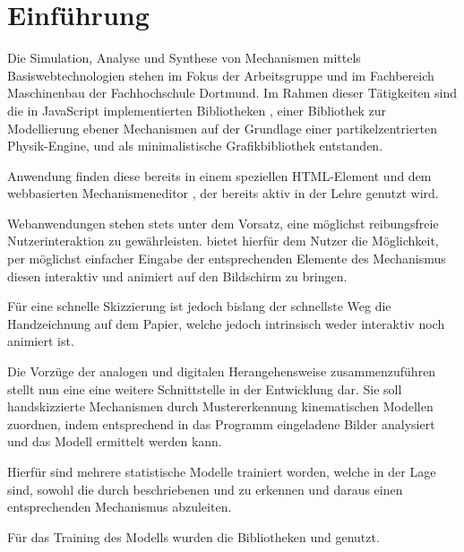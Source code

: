 \section{Einführung}
Die Simulation, Analyse und Synthese von Mechanismen mittels Basiswebtechnologien stehen im Fokus der Arbeitsgruppe  und  im Fachbereich Maschinenbau der Fachhochschule Dortmund.
Im Rahmen dieser Tätigkeiten sind die in JavaScript implementierten Bibliotheken \cite{Goessner2019}\cite{Goessner2019a}\cite{Goessner2018}, einer Bibliothek zur Modellierung ebener Mechanismen auf der Grundlage einer partikelzentrierten Physik-Engine, und \cite{Goessner2019b} als minimalistische Grafikbibliothek entstanden. 

Anwendung finden diese bereits in einem speziellen  HTML-Element und dem webbasierten Mechanismeneditor \cite{Uhlig2019}\cite{Uhlig2019a}, der bereits aktiv in der Lehre genutzt wird.

Webanwendungen stehen stets unter dem Vorsatz, eine möglichst reibungsfreie Nutzerinteraktion zu gewährleisten.
 bietet hierfür dem Nutzer die Möglichkeit, per möglichst einfacher Eingabe der entsprechenden Elemente des Mechanismus diesen interaktiv und animiert auf den Bildschirm zu bringen.

Für eine schnelle Skizzierung ist jedoch bislang der schnellste Weg die Handzeichnung auf dem Papier, welche jedoch intrinsisch weder interaktiv noch animiert ist.

Die Vorzüge der analogen und digitalen Herangehensweise zusammenzuführen stellt nun eine eine weitere Schnittstelle in der Entwicklung dar.
Sie soll handskizzierte Mechanismen durch Mustererkennung kinematischen Modellen zuordnen, indem entsprechend in das Programm eingeladene Bilder analysiert und das  Modell ermittelt werden kann.

Hierfür sind mehrere statistische Modelle trainiert worden, welche in der Lage sind, sowohl die durch  beschriebenen  und  zu erkennen und daraus einen entsprechenden Mechanismus abzuleiten.

Für das Training des Modells wurden die Bibliotheken \cite{Google2019} und \cite{Chollet2019}\cite{Chollet2017} genutzt.
